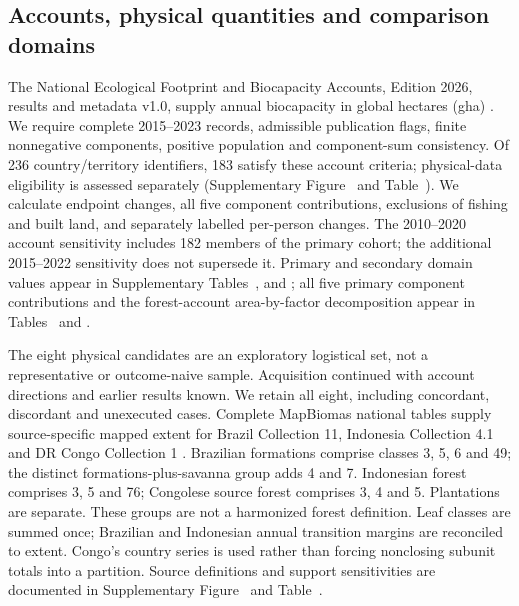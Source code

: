 \documentclass[11pt,a4paper]{article}
\begin{document}
\subsection{Accounts, physical quantities and comparison domains}
The National Ecological Footprint and Biocapacity Accounts, Edition 2026, results and metadata v1.0, supply annual biocapacity in global hectares (gha) \citep{Lo2026}. We require complete 2015--2023 records, admissible publication flags, finite nonnegative components, positive population and component-sum consistency. Of 236 country/territory identifiers, 183 satisfy these account criteria; physical-data eligibility is assessed separately (Supplementary Figure~ and Table~). We calculate endpoint changes, all five component contributions, exclusions of fishing and built land, and separately labelled per-person changes. The 2010--2020 account sensitivity includes 182 members of the primary cohort; the additional 2015--2022 sensitivity does not supersede it. Primary and secondary domain values appear in Supplementary Tables~,  and ; all five primary component contributions and the forest-account area-by-factor decomposition appear in Tables~ and .

The eight physical candidates are an exploratory logistical set, not a representative or outcome-naive sample. Acquisition continued with account directions and earlier results known. We retain all eight, including concordant, discordant and unexecuted cases. Complete MapBiomas national tables supply source-specific mapped extent for Brazil Collection 11, Indonesia Collection 4.1 and DR Congo Collection 1 \citep{MapBiomas2026,MapBiomasIDN2026,MapBiomasCOD2026}. Brazilian formations comprise classes 3, 5, 6 and 49; the distinct formations-plus-savanna group adds 4 and 7. Indonesian forest comprises 3, 5 and 76; Congolese source forest comprises 3, 4 and 5. Plantations are separate. These groups are not a harmonized forest definition. Leaf classes are summed once; Brazilian and Indonesian annual transition margins are reconciled to extent. Congo's country series is used rather than forcing nonclosing subunit totals into a partition. Source definitions and support sensitivities are documented in Supplementary Figure~ and Table~.
\end{document}
